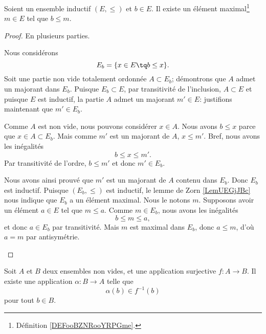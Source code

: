 \begin{proposition}       \label{PROPooFOETooWYLOeq}
	Soient un ensemble inductif \( (E,\leq)\) et \( b\in E\). Il existe un élément maximal\footnote{Définition \ref{DEFooBZNRooYRPGme}.} \( m\in E\) tel que \( b\leq m\).
\end{proposition}

\begin{proof}
	En plusieurs parties.
	\begin{subproof}
		\spitem[Un ensemble]
		Nous considérons
		\begin{equation}
			E_b=\{ x\in E\tq b\leq x \}.
		\end{equation}
		Soit une partie non vide totalement ordonnée \( A \subset E_b\); démontrons que \( A \) admet un majorant dans \( E_b \). Puisque \( E_b \subset E\), par transitivité de l'inclusion, \( A \subset E \) et puisque \( E\) est inductif, la partie \( A\) admet un majorant \( m'\in E\): justifions maintenant que \( m' \in E_b \).

		Comme \( A\) est non vide, nous pouvons considérer \( x\in A\). Nous avons \( b\leq x\) parce que \( x\in A\subset E_b\). Mais comme \( m'\) est un majorant de \( A\), \( x\leq m'\). Bref, nous avons les inégalités
		\begin{equation}
			b\leq x\leq m'.
		\end{equation}
		Par transitivité de l'ordre, \( b \leq m' \) et donc \( m'\in E_b\).

		Nous avons ainsi prouvé que \( m'\) est un majorant de \( A\) contenu dans \( E_b\). Donc \( E_b\) est inductif.
		\spitem[Zorn]
		Puisque \( (E_b,\leq)\) est inductif, le lemme de Zorn \ref{LemUEGjJBc} nous indique que \( E_b\) a un élément maximal. Nous le notons \( m\).
		Supposons avoir un élément \( a\in E\) tel que \( m\leq a\). Comme \( m \in E_b \), nous avons les inégalités
		\begin{equation}
			b\leq m\leq a,
		\end{equation}
		et donc \( a\in E_b\) par transitivité. Mais \( m\) est maximal dans \( E_b\), donc \( a \leq m \), d'où \( a=m\) par antisymétrie.
	\end{subproof}
\end{proof}


\begin{proposition}	\label{PROPooRHNFooHFUOEx}
	Soit \( A \) et \( B \) deux ensembles non vides, et une application surjective \(f \colon A\to B  \). Il existe une application \(\alpha \colon B\to A  \) telle que
	\begin{equation}
		\alpha(b)\in f^{-1}(b)
	\end{equation}
	pour tout \( b\in B\).
\end{proposition}

